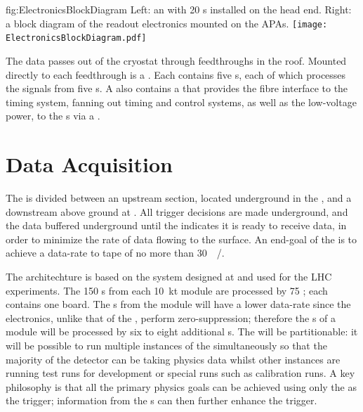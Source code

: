 \begin{dunefigure}{fig:ElectronicsBlockDiagram}
{Left: an  with 20 s installed on the head end. Right: a block diagram of the readout electronics mounted on the APAs.}
\texttt{[image: ElectronicsBlockDiagram.pdf]}
\end{dunefigure}

The data passes out of the cryostat through feedthroughs in the roof. Mounted directly to each feedthrough is a . Each  contains five s, each of which processes the signals from five s. A  also contains a  that provides the fibre interface to the timing system, fanning out timing and control systems, as well as the low-voltage power, to the s via a .

\section{Data Acquisition}
\label{sec:fdsp-exec-daq}


The  is divided between an upstream section, located underground in the , and a downstream  above ground at . All trigger decisions are made underground, and the data buffered underground until the  indicates it is ready to receive data, in order to minimize the rate of data flowing to the surface. An end-goal of the  is to achieve a data-rate to tape of no more than \SI{30}{\peta\byte/\year}.

The  architechture is based on the  system designed at  and used for the LHC
experiments. The 150 s from each \SI{10}{\kilo\tonne} module are processed by 75 ; each  contains one  board. The s from the module will have a lower data-rate since the  electronics, unlike that of the , perform zero-suppression; therefore the s of a module will be processed by six to eight additional s. The  will be partitionable: it will be possible to run multiple instances of the  simultaneously so that the majority of the detector can be taking physics data whilst other  instances are running test runs for development or special runs such as calibration runs. A key philosophy is that all the primary  physics goals can be achieved using only the  as the trigger; information from the s can then further enhance the trigger.

